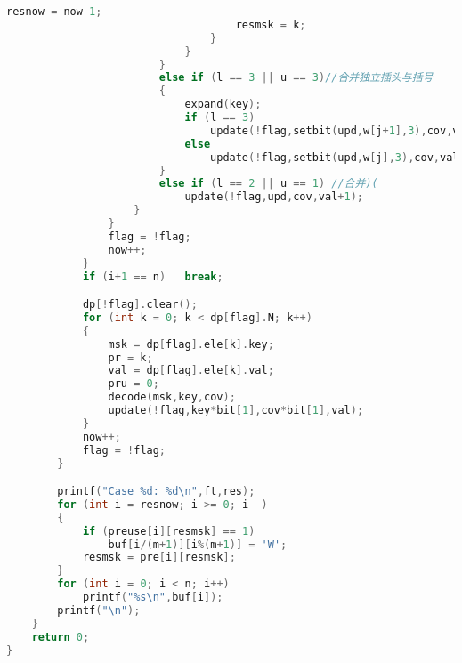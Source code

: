 \begin{lstlisting}[language=c++]
                                    resnow = now-1;
                                    resmsk = k;
                                }
                            }
                        }
                        else if (l == 3 || u == 3)//合并独立插头与括号
                        {
                            expand(key);
                            if (l == 3)
                                update(!flag,setbit(upd,w[j+1],3),cov,val+1);
                            else
                                update(!flag,setbit(upd,w[j],3),cov,val+1);
                        }
                        else if (l == 2 || u == 1) //合并)(
                            update(!flag,upd,cov,val+1);
                    }
                }
                flag = !flag;
                now++;
            }
            if (i+1 == n)   break;

            dp[!flag].clear();
            for (int k = 0; k < dp[flag].N; k++)
            {
                msk = dp[flag].ele[k].key;
                pr = k;
                val = dp[flag].ele[k].val;
                pru = 0;
                decode(msk,key,cov);
                update(!flag,key*bit[1],cov*bit[1],val);
            }
            now++;
            flag = !flag;
        }

        printf("Case %d: %d\n",ft,res);
        for (int i = resnow; i >= 0; i--)
        {
            if (preuse[i][resmsk] == 1)
                buf[i/(m+1)][i%(m+1)] = 'W';
            resmsk = pre[i][resmsk];
        }
        for (int i = 0; i < n; i++)
            printf("%s\n",buf[i]);
        printf("\n");
    }
    return 0;
}
    \end{lstlisting}